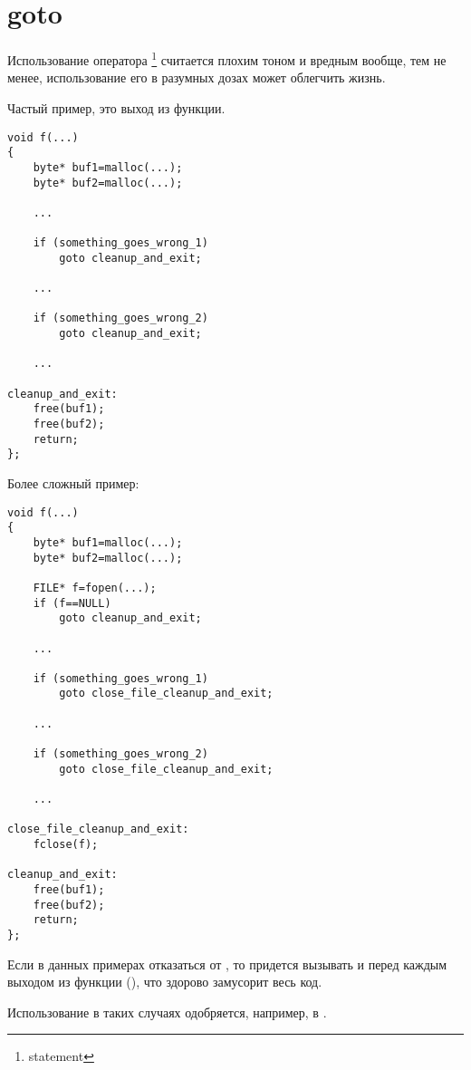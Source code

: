 ﻿\section{goto}

Использование оператора \footnote{statement} считается плохим тоном и вредным вообще\cite{Dijkstra:1968:LEG:362929.362947}\cite{Dijkstra:1979:GSC:1241515.1241518}, 
тем не менее, использование его в разумных дозах\cite{Knuth:1974:SPG:356635.356640} может облегчить жизнь.

Частый пример, это выход из функции.

\begin{lstlisting}
void f(...)
{
	byte* buf1=malloc(...);
	byte* buf2=malloc(...);

	...

	if (something_goes_wrong_1)
		goto cleanup_and_exit;

	...
	
	if (something_goes_wrong_2)
		goto cleanup_and_exit;

	...

cleanup_and_exit:
	free(buf1);
	free(buf2);
	return;
};
\end{lstlisting}

Более сложный пример:

\begin{lstlisting}
void f(...)
{
	byte* buf1=malloc(...);
	byte* buf2=malloc(...);

	FILE* f=fopen(...);
	if (f==NULL)
		goto cleanup_and_exit;

	...

	if (something_goes_wrong_1)
		goto close_file_cleanup_and_exit;

	...
	
	if (something_goes_wrong_2)
		goto close_file_cleanup_and_exit;

	...

close_file_cleanup_and_exit:
	fclose(f);

cleanup_and_exit:
	free(buf1);
	free(buf2);
	return;
};
\end{lstlisting}

Если в данных примерах отказаться от , то придется вызывать  и 
перед каждым выходом из функции (), что здорово замусорит весь код.

Использование  в таких случаях одобряется, например, в \cite{LinuxKernelCodingStyle}.


